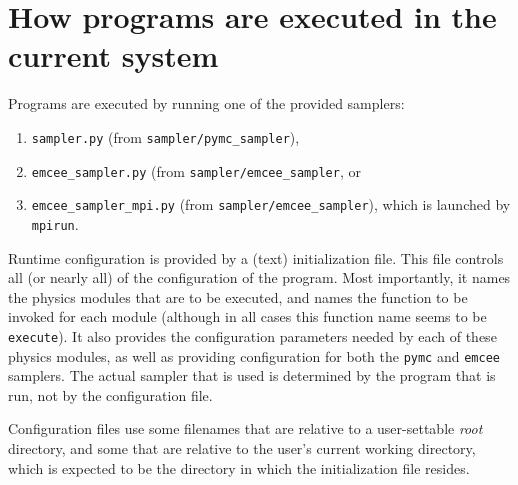 \documentclass{memarticle}
\newcommand{\prog}[1]%
  {\texttt{#1}}
\begin{document}
\section{How programs are executed in the current system}

Programs are executed by running one of the provided samplers:
\begin{enumerate}
\item \prog{sampler.py} (from \prog{sampler/pymc\_sampler}),
\item \prog{emcee\_sampler.py} (from \prog{sampler/emcee\_sampler}, or
\item \prog{emcee\_sampler\_mpi.py} (from
  \prog{sampler/emcee\_sampler}), which is launched by \prog{mpirun}.
\end{enumerate}

Runtime configuration is provided by a (text) initialization file. This
file controls all (or nearly all) of the configuration of the program.
Most importantly, it names the physics modules that are to be executed,
and names the function to be invoked for each module (although in all
cases this function name seems to be \texttt{execute}). It also provides
the configuration parameters needed by each of these physics modules, as
well as providing configuration for both the \texttt{pymc} and
\texttt{emcee} samplers. The actual sampler that is used is determined
by the program that is run, not by the configuration file.

Configuration files use some filenames that are relative to a
user-settable \emph{root} directory, and some that are relative to the
user's current working directory, which is expected to be the directory
in which the initialization file resides.



\end{document}
